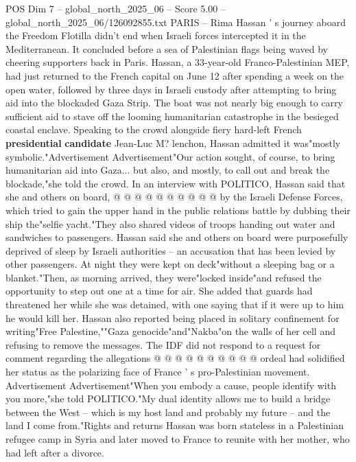 \begin{textsample}{POS Dim 7 – global\_north\_2025\_06 – Score 5.00 – global\_north\_2025\_06/126092855.txt}  \label{ex:f7_pos_381}
PARIS -- Rima Hassan ' s journey aboard the Freedom Flotilla didn't end when Israeli forces intercepted it in the Mediterranean.
It concluded before a sea of Palestinian flags being waved by cheering supporters back in Paris.
Hassan, a 33-year-old Franco-Palestinian MEP, had just returned to the French capital on June 12 after spending a week on the open water, followed by three days in Israeli custody after attempting to bring aid into the blockaded Gaza Strip.
The boat was not nearly big enough to carry sufficient aid to stave off the looming humanitarian catastrophe in the besieged coastal enclave.
Speaking to the crowd alongside fiery hard-left French \textbf{presidential} \textbf{candidate} Jean-Luc M? lenchon, Hassan admitted it was"mostly symbolic."Advertisement Advertisement"Our action sought, of course, to bring humanitarian aid into Gaza... but also, and mostly, to call out and break the blockade,"she told the crowd.
In an interview with POLITICO, Hassan said that she and others on board, @ @ @ @ @ @ @ @ @ @ by the Israeli Defense Forces, which tried to gain the upper hand in the public relations battle by dubbing their ship the"selfie yacht."They also shared videos of troops handing out water and sandwiches to passengers.
Hassan said she and others on board were purposefully deprived of sleep by Israeli authorities -- an accusation that has been levied by other passengers.
At night they were kept on deck"without a sleeping bag or a blanket."Then, as morning arrived, they were"locked inside"and refused the opportunity to step out one at a time for air.
She added that guards had threatened her while she was detained, with one saying that if it were up to him he would kill her.
Hassan also reported being placed in solitary confinement for writing"Free Palestine,""Gaza genocide"and"Nakba"on the walls of her cell and refusing to remove the messages.
The IDF did not respond to a request for comment regarding the allegations @ @ @ @ @ @ @ @ @ @ ordeal had solidified her status as the polarizing face of France ' s pro-Palestinian movement.
Advertisement Advertisement"When you embody a cause, people identify with you more,"she told POLITICO."My dual identity allows me to build a bridge between the West -- which is my host land and probably my future -- and the land I come from."Rights and returns Hassan was born stateless in a Palestinian refugee camp in Syria and later moved to France to reunite with her mother, who had left after a divorce.

\end{textsample}
